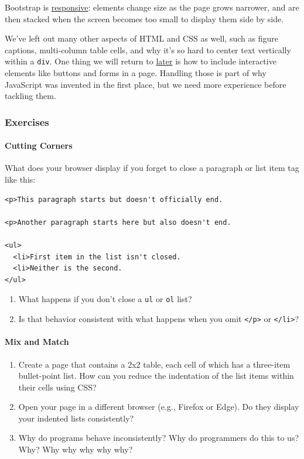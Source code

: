 Bootstrap is \protect\hyperlink{g:responsive-design}{responsive}:
elements change size as the page grows narrower, and are then stacked
when the screen becomes too small to display them side by side.

We've left out many other aspects of HTML and CSS as well, such as
figure captions, multi-column table cells, and why it's so hard to
center text vertically within a \texttt{div}. One thing we will return
to \protect\hyperlink{s:interactive}{later} is how to include
interactive elements like buttons and forms in a page. Handling those is
part of why JavaScript was invented in the first place, but we need more
experience before tackling them.

\subsubsection{Exercises}\label{s:htmlcss-exercises}

\paragraph{Cutting Corners}\label{cutting-corners}

What does your browser display if you forget to close a paragraph or
list item tag like this:

\begin{verbatim}
<p>This paragraph starts but doesn't officially end.

<p>Another paragraph starts here but also doesn't end.

<ul>
  <li>First item in the list isn't closed.
  <li>Neither is the second.
</ul>
\end{verbatim}

\begin{enumerate}
\tightlist
\item
  What happens if you don't close a \texttt{ul} or \texttt{ol} list?
\item
  Is that behavior consistent with what happens when you omit
  \texttt{\textless{}/p\textgreater{}} or
  \texttt{\textless{}/li\textgreater{}}?
\end{enumerate}

\paragraph{Mix and Match}\label{mix-and-match}

\begin{enumerate}
\tightlist
\item
  Create a page that contains a 2x2 table, each cell of which has a
  three-item bullet-point list. How can you reduce the indentation of
  the list items within their cells using CSS?
\item
  Open your page in a different browser (e.g., Firefox or Edge). Do they
  display your indented lists consistently?
\item
  Why do programs behave inconsistently? Why do programmers do this to
  us? Why? Why why why why why?
\end{enumerate}


